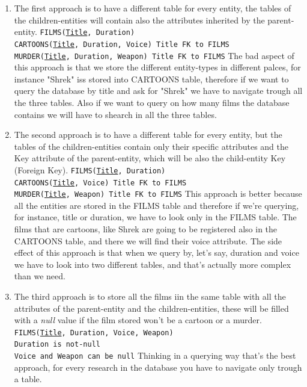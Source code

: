 \documentclass[class=book, crop=false, oneside]{standalone}
\begin{document}
\begin{enumerate}
	\item The first approach is to have a different table for every entity, the tables of the children-entities will contain also the attributes inherited by the parent-entity.
	\vskip 5pt
	\texttt{FILMS(\underline{Title}, Duration)}\\
	\texttt{CARTOONS(\underline{Title}, Duration, Voice)   Title FK to FILMS}\\
	\texttt{MURDER(\underline{Title}, Duration, Weapon)   Title FK to FILMS}
	\vskip 5pt
	The bad aspect of this approach is that we store the different entity-types in different palces, for instance "Shrek" iss stored into CARTOONS table, therefore if we want to query the database by title and ask for "Shrek" we have to navigate trough all the three tables. Also if we want to query on how many films the database contains we will have to shearch in all the three tables.
	\item The second approach is to have a different table for every entity, but the tables of the children-entities contain only their specific attributes and the Key attribute of the parent-entity, which will be also the child-entity Key (Foreign Key).
	\vskip 5pt
	\texttt{FILMS(\underline{Title}, Duration)}\\
	\texttt{CARTOONS(\underline{Title}, Voice)   Title FK to FILMS}\\
	\texttt{MURDER(\underline{Title}, Weapon)   Title FK to FILMS}
	\vskip 5pt
	This approach is better because all the entities are stored in the FILMS table and therefore if we're querying, for instance, title or duration, we have to look only in the FILMS table. The films that are cartoons, like Shrek are going to be registered also in the CARTOONS table, and there we will find their voice attribute.
	The side effect of this approach is that when we query by, let's say, duration and voice we have to look into two different tables, and that's actually more complex than we need.
	\item The third approach is to store all the films iin the same table with all the attributes of the parent-entity and the children-entities, these will be filled with a \emph{null} value if the film stored won't be a cartoon or a murder.
	\vskip 5pt
	\texttt{FILMS(\underline{Title}, Duration, Voice, Weapon)}\\
	\texttt{Duration is not-null}\\
	\texttt{Voice and Weapon can be null}
	\vskip 5pt
	Thinking in a querying way that's the best approach, for every research in the database you have to navigate only trough a table.
\end{enumerate}
\end{document}
